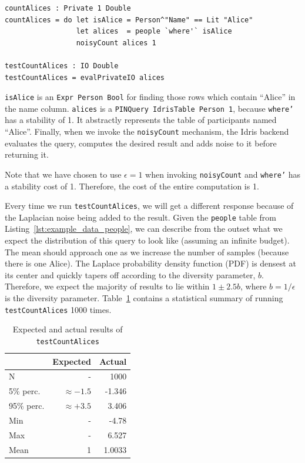 \documentclass[12pt]{report}
\begin{document}
\begin{lstlisting}[caption={Counting Alices},label={lst:counting_alices}]
countAlices : Private 1 Double
countAlices = do let isAlice = Person^"Name" == Lit "Alice"
                 let alices  = people `where'` isAlice
                 noisyCount alices 1

testCountAlices : IO Double
testCountAlices = evalPrivateIO alices
\end{lstlisting}

\texttt{isAlice} is an \texttt{Expr Person Bool} for finding those rows which contain ``Alice'' in the name column.
\texttt{alices} is a \texttt{PINQuery IdrisTable Person 1}, because \texttt{where'} has a stability of 1.
It abstractly represents the table of participants named ``Alice''.
Finally, when we invoke the \texttt{noisyCount} mechanism, the Idris backend evaluates the query, computes the desired result and adds noise to it before returning it.

Note that we have chosen to use $\epsilon = 1$ when invoking \texttt{noisyCount} and \texttt{where'} has a stability cost of 1.
Therefore, the cost of the entire computation is 1.

Every time we run \texttt{testCountAlices}, we will get a different response because of the Laplacian noise being added to the result.
Given the \texttt{people} table from Listing~\ref{lst:example_data_people}, we can describe from the outset what we expect the distribution of this query to look like (assuming an infinite budget).
The mean should approach one as we increase the number of samples (because there is one Alice).
The Laplace probability density function (PDF) is densest at its center and quickly tapers off according to the diversity parameter, $b$.
Therefore, we expect the majority of results to lie within $1 \pm 2.5b$, where $b=1/\epsilon$ is the diversity parameter.
Table~\ref{tab:testCountAlices_results} contains a statistical summary of running \texttt{testCountAlices} 1000 times.

\begin{table}[h!]
  \caption{Expected and actual results of \texttt{testCountAlices}}
  \label{tab:testCountAlices_results}
  \centering

  \begin{tabular}{|l|rr|}
  \hline

  \hline
  \textbf{} & \textbf{Expected} & \textbf{Actual} \\
  \hline
    N          &             -  &   1000 \\
    5\% perc.  & $\approx -1.5$ & -1.346 \\
    95\% perc. & $\approx +3.5$ &  3.406 \\
    Min        &             -  &  -4.78 \\
    Max        &             -  &  6.527 \\
    Mean       &             1  & 1.0033 \\
  \hline

  \hline
  \end{tabular}
\end{table}
\end{document}
